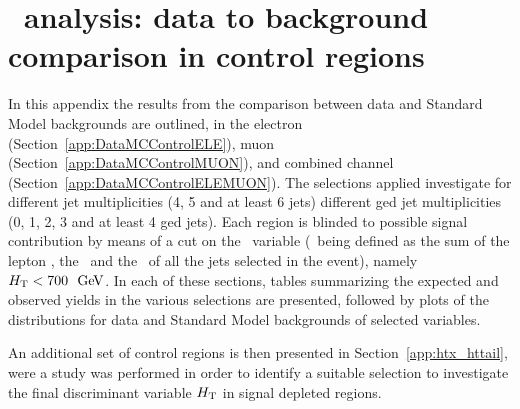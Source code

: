 \clearpage{\pagestyle{empty}\cleardoublepage}

\chapter{\htx\ analysis: data to background comparison in control regions}\label{app:htxcontrol}

In this appendix the results from the comparison between data and
Standard Model backgrounds are outlined, in the electron 
(Section~\ref{app:DataMCControlELE}), muon (Section~\ref{app:DataMCControlMUON}), 
and combined channel (Section~\ref{app:DataMCControlELEMUON}).
The selections applied investigate for different jet multiplicities
(4, 5 and at least 6 jets) different \btag ged jet multiplicities
(0, 1, 2, 3 and at least 4 \btag ged jets). Each region is blinded
to possible signal contribution by means of a cut on the \HT\
variable (\HT\ being defined as the sum of the lepton \pt, the
\met\ and the \pt\ of all the jets selected in the event),
namely $\HT<700~\gev$.
In each of these sections, tables summarizing the
expected and observed yields in the various selections
are presented, followed by plots of the distributions
for data and Standard Model backgrounds of selected variables.

An additional set of control regions
is then presented in Section~\ref{app:htx_httail},
were a study was performed in order to identify
a suitable selection to investigate the final
discriminant variable $\HT$ in signal depleted
regions.


\clearpage


\clearpage






